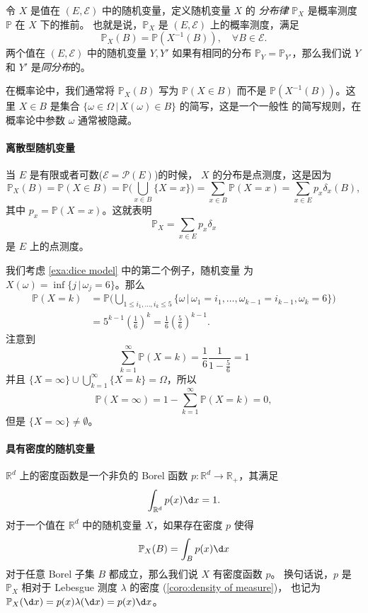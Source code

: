 \documentclass[fontset=none]{Notes}
\begin{document}
\begin{definition}
  令 $X$ 是值在 $(E,\mathcal{E})$ 中的随机变量，定义随机变量 $X$ 的
  \emph{分布律} $\mathbb{P}_X$ 是概率测度 $\mathbb{P}$ 在 $X$ 下的推前。
  也就是说，$\mathbb{P}_X$ 是 $(E,\mathcal{E})$ 上的概率测度，满足
  \[
    \mathbb{P}_X(B)=\mathbb{P}(X^{-1}(B)),\quad \forall B\in \mathcal{E}.
  \]
  两个值在 $(E,\mathcal{E})$ 中的随机变量 $Y,Y'$ 如果有相同的分布
  $\mathbb{P}_Y=\mathbb{P}_{Y'}$，那么我们说 $Y$ 和 $Y'$ 是\emph{同分布}的。
\end{definition}

在概率论中，我们通常将 $\mathbb{P}_X(B)$ 写为 $\mathbb{P}(X\in B)$
而不是 $\mathbb{P}(X^{-1}(B))$。这里 $X\in B$ 是集合
$\{\omega\in\Omega\,|\, X(\omega)\in B\}$ 的简写，这是一个一般性
的简写规则，在概率论中参数 $\omega$ 通常被隐藏。

\paragraph{离散型随机变量}
当 $E$ 是有限或者可数($\mathcal{E}=\mathcal{P}(E)$)的时候，
$X$ 的分布是点测度，这是因为
\[
  \mathbb{P}_X(B)=\mathbb{P}(X\in B)=\mathbb{P}\biggl(\bigcup_{x\in B}\{X=x\}\biggr)
  =\sum_{x\in B}\mathbb{P}(X=x)=\sum_{x\in E}p_x\delta_x(B),
\]
其中 $p_x=\mathbb{P}(X=x)$。这就表明
\[
  \mathbb{P}_X=\sum_{x\in E}p_x\delta_x 
\]
是 $E$ 上的点测度。

\begin{example}
  我们考虑 \eqref{exa:dice model} 中的第二个例子，随机变量
  为 $X(\omega)=\inf\{j\,|\,\omega_j=6\}$。那么
  \begin{align*}
    \mathbb{P}(X=k)&=\mathbb{P}
    \biggl(\bigcup_{1\leq i_1,\dots,i_k\leq 5}\{\omega\,|\, 
    \omega_1=i_1,\dots,\omega_{k-1}=i_{k-1},\omega_k=6\}\biggr)\\
    &=5^{k-1}\left(\frac{1}{6}\right)^k=\frac{1}{6}\left(\frac{5}{6}\right)^{k-1}.
  \end{align*}
  注意到
  \[
    \sum_{k=1}^\infty \mathbb{P}(X=k)=\frac{1}{6}\frac{1}{1-\frac{5}{6}}=1
  \]
  并且 $\{X=\infty\}\cup\bigcup_{k=1}^\infty \{X=k\}=\Omega$，所以
  \[
    \mathbb{P}(X=\infty)=1-\sum_{k=1}^\infty \mathbb{P}(X=k)=0,
  \]  
  但是 $\{X=\infty\}\neq\emptyset$。
\end{example}

\paragraph{具有密度的随机变量} $\mathbb{R}^d$ 上的密度函数是一个非负的 Borel 函数
$p:\mathbb{R}^d\to \mathbb{R}_+$，其满足 
\[
  \int_{\mathbb{R}^d} p(x)\d x=1.
\]
对于一个值在 $\mathbb{R}^d$ 中的随机变量 $X$，如果存在密度 $p$ 使得
\[
  \mathbb{P}_X(B)=\int_B p(x)\d x
\]
对于任意 Borel 子集 $B$ 都成立，那么我们说 $X$ 有密度函数 $p$。
换句话说，$p$ 是 $\mathbb{P}_X$ 相对于 Lebesgue 测度 $\lambda$ 的密度
(\autoref{coro:density of measure})，
也记为 $\mathbb{P}_X(\d x)=p(x)\lambda(\d x)=p(x)\d x$。
\end{document}
